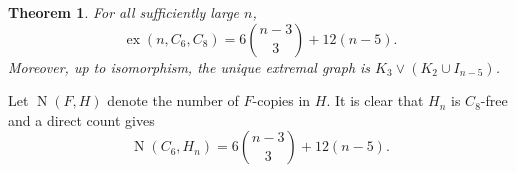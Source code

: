 \documentclass[11pt,letterpaper]{article}
\newtheorem{theorem}{Theorem}[section]
\newcommand{\ex}{\operatorname{ex}}
\newcommand{\N}{\operatorname{N}}
\begin{document}
\begin{theorem}\label{thm:main}
For all sufficiently large $n$,
\[
  \ex(n,C_6,C_8)=6\binom{n-3}{3}+12(n-5).
\]
Moreover, up to isomorphism, the unique extremal graph is $K_3\vee (K_2\cup I_{n-5})$.
\end{theorem}

Let $\N(F,H)$ denote the number of $F$-copies in $H$. It is clear that $H_n$ is $C_8$-free and %
 a direct count gives
\[
 \N(C_6,H_n)=6\binom{n-3}{3}+12(n-5).
\]



\end{document}

